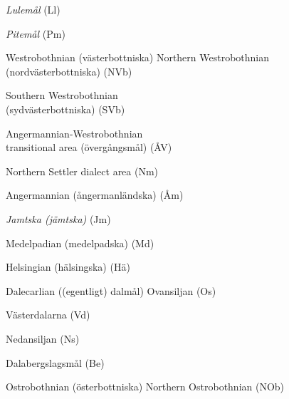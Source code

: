 \item 

\textit{Lulemål} (Ll)

\item 

\textit{Pitemål} (Pm)


\item 

Westrobothnian (västerbottniska)  Northern Westrobothnian (nordvästerbottniska) (NVb)

\item 

Southern Westrobothnian\\
(sydvästerbottniska) (SVb)

\item 

Angermannian-Westrobothnian\\
transitional area (övergångsmål) (ÅV)


Northern Settler dialect area (Nm)  

Angermannian (ångermanländska) (Åm)  

\textit{Jamtska (jämtska)} (Jm)  

Medelpadian (medelpadska) (Md)  

Helsingian (hälsingska) (Hä)  

\item 

Dalecarlian ((egentligt) dalmål)  Ovansiljan (Os)

\item 

Västerdalarna (Vd)

\item 

Nedansiljan (Ns)


Dalabergslagsmål (Be)  

\item 

Ostrobothnian (österbottniska)  Northern Ostrobothnian (NOb)

\item 

